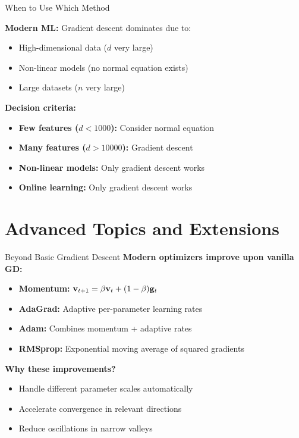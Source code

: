 \documentclass[usenames,dvipsnames]{beamer}
\begin{document}
  \begin{frame}{When to Use Which Method}
    \begin{keypointsbox}{}
    \textbf{Modern ML:} Gradient descent dominates due to:
    \begin{itemize}
        \item High-dimensional data ($d$ very large)
        \item Non-linear models (no normal equation exists)
        \item Large datasets ($n$ very large)
    \end{itemize}
    \end{keypointsbox}
    
    \pause
    \textbf{Decision criteria:}
    \begin{itemize}[<+->]
        \item \textbf{Few features ($d < 1000$):} Consider normal equation
        \item \textbf{Many features ($d > 10000$):} Gradient descent
        \item \textbf{Non-linear models:} Only gradient descent works
        \item \textbf{Online learning:} Only gradient descent works
    \end{itemize}
  \end{frame}

  \section{Advanced Topics and Extensions}

  \begin{frame}{Beyond Basic Gradient Descent}
    \textbf{Modern optimizers improve upon vanilla GD:}
    
    \begin{itemize}[<+->]
        \item \textbf{Momentum:} $\mathbf{v}_{t+1} = \beta \mathbf{v}_t + (1-\beta)\mathbf{g}_t$
        \item \textbf{AdaGrad:} Adaptive per-parameter learning rates
        \item \textbf{Adam:} Combines momentum + adaptive rates  
        \item \textbf{RMSprop:} Exponential moving average of squared gradients
    \end{itemize}
    
    \pause
    \textbf{Why these improvements?}
    \begin{itemize}[<+->]
        \item Handle different parameter scales automatically
        \item Accelerate convergence in relevant directions
        \item Reduce oscillations in narrow valleys
    \end{itemize}
  \end{frame}
\end{document}
